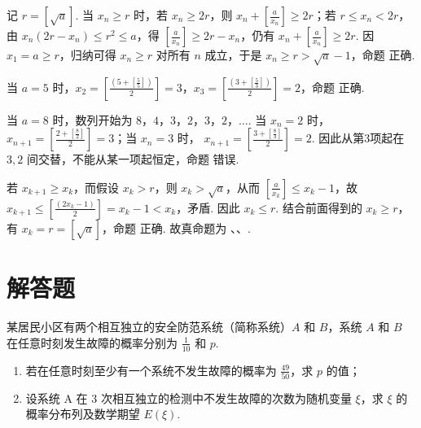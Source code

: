 \begin{solution}
记 \(r=[\sqrt a]\). 当 \(x_n\geqslant r\) 时，若 \(x_n\geqslant2r\)，则
\(x_n+[\frac{a}{x_n}]\geqslant2r\)；若 \(r\leqslant x_n<2r\)，由
\(x_n(2r-x_n)\leqslant r^2\leqslant a\)，得 \([\frac{a}{x_n}]\geqslant2r-x_n\)，仍有
\(x_n+[\frac{a}{x_n}]\geqslant2r\). 因 \(x_1=a\geqslant r\)，归纳可得 \(x_n\geqslant r\) 对所有 \(n\) 成立，于是
\(x_n\geqslant r>\sqrt a-1\)，命题  正确.

当 \(a=5\) 时，\(x_2=[\frac{(5+[\frac{5}{5}])}{2}]=3\)，\(x_3=[\frac{(3+[\frac{5}{3}])}{2}]=2\)，命题  正确.

当 \(a=8\) 时，数列开始为
\(8\)，\(4\)，\(3\)，\(2\)，\(3\)，\(2\)，\(\ldots\). 当 \(x_n=2\) 时，
\(x_{n+1}=\left[\frac{2+[\frac{8}{2}]}2\right]=3\)；当 \(x_n=3\) 时，
\(x_{n+1}=\left[\frac{3+[\frac{8}{3}]}2\right]=2\). 因此从第3项起在 \(3,2\) 间交替，不能从某一项起恒定，命题  错误.

若 \(x_{k+1}\geqslant x_k\)，而假设 \(x_k>r\)，则 \(x_k>\sqrt a\)，从而
\([\frac{a}{x_k}]\leqslant x_k-1\)，故
\(x_{k+1}\leqslant[\frac{(2x_k-1)}{2}]=x_k-1<x_k\)，矛盾. 因此 \(x_k\leqslant r\). 结合前面得到的 \(x_k\geqslant r\)，有 \(x_k=r=[\sqrt a]\)，命题  正确.
故真命题为 、、.
\end{solution}

\section{解答题}

\begin{problem}
某居民小区有两个相互独立的安全防范系统（简称系统）\(A\) 和 \(B\)，系统 \(A\) 和 \(B\) 在任意时刻发生故障的概率分别为 \(\frac{1}{10}\) 和 \(p\).
\begin{enumerate}
\item 若在任意时刻至少有一个系统不发生故障的概率为 \(\frac{49}{50}\)，求 \(p\) 的值；
\item 设系统 A 在 3 次相互独立的检测中不发生故障的次数为随机变量 \(\xi\)，求 \(\xi\) 的概率分布列及数学期望 \(E(\xi)\).
\end{enumerate}
\end{problem}

